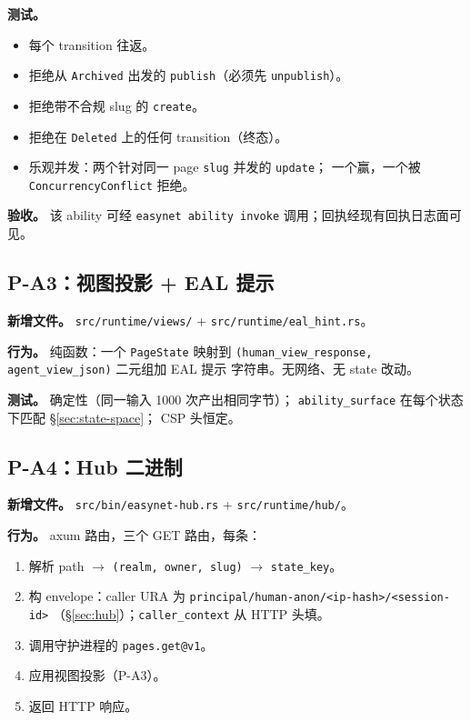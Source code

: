 \documentclass[11pt,a4paper]{article}
\theoremstyle{definition}
\begin{document}
\textbf{测试。}
\begin{itemize}[leftmargin=2.2em,itemsep=0.1em]
    \item 每个 transition 往返。
    \item 拒绝从 \texttt{Archived} 出发的 \texttt{publish}（必须先
    \texttt{unpublish}）。
    \item 拒绝带不合规 slug 的 \texttt{create}。
    \item 拒绝在 \texttt{Deleted} 上的任何 transition（终态）。
    \item 乐观并发：两个针对同一 page \texttt{slug} 并发的 \texttt{update}；
    一个赢，一个被 \texttt{ConcurrencyConflict} 拒绝。
\end{itemize}

\textbf{验收。} 该 ability 可经 \texttt{easynet ability invoke}
调用；回执经现有回执日志面可见。

\subsection{P-A3：视图投影 + EAL 提示}

\textbf{新增文件。} \texttt{src/runtime/views/} +
\texttt{src/runtime/eal\_hint.rs}。

\textbf{行为。} 纯函数：一个 \texttt{PageState} 映射到
\texttt{(human\_view\_response, agent\_view\_json)} 二元组加 EAL 提示
字符串。无网络、无 state 改动。

\textbf{测试。} 确定性（同一输入 1000 次产出相同字节）；
\texttt{ability\_surface} 在每个状态下匹配 \S\ref{sec:state-space}；
CSP 头恒定。

\subsection{P-A4：Hub 二进制}

\textbf{新增文件。} \texttt{src/bin/easynet-hub.rs} +
\texttt{src/runtime/hub/}。

\textbf{行为。} axum 路由，三个 GET 路由，每条：
\begin{enumerate}[leftmargin=2.2em,itemsep=0.1em]
    \item 解析 path $\to$ \texttt{(realm, owner, slug)} $\to$
    \texttt{state\_key}。
    \item 构 envelope：caller URA 为
    \texttt{principal/human-anon/<ip-hash>/<session-id>}
    （\S\ref{sec:hub}）；\texttt{caller\_context} 从 HTTP 头填。
    \item 调用守护进程的 \texttt{pages.get@v1}。
    \item 应用视图投影（P-A3）。
    \item 返回 HTTP 响应。
\end{enumerate}
\end{document}
